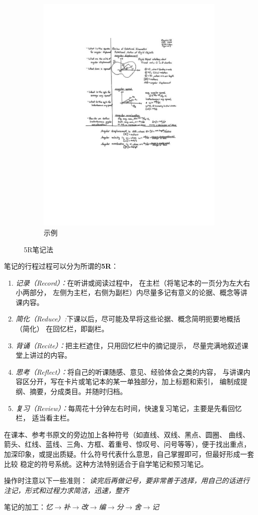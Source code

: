\begin{figure}[h]
\begin{subfigure}[t]{0.45\textwidth}
		\includegraphics[width=\textwidth]{./images/Ch00/Cornell-NTS/exCNTS.pdf}
		\caption{示例}\label{fig:5R-2}
	\end{subfigure}
	\caption{5R笔记法}\label{fig:5R}
\end{figure}
	
笔记的行程过程可以分为所谓的{\bf 5R}：

\begin{enumerate}[Step1]
  \setlength{\itemindent}{1cm}
  \setlength{\topsep}{0pt}
  \item {\it 记录（Record）：}在听讲或阅读过程中，
  在主栏（将笔记本的一页分为左大右小两部分，
  左侧为主栏，右侧为副栏）内尽量多记有意义的论据、概念等讲课内容。
  \item {\it 简化（Reduce）:}下课以后，尽可能及早将这些论据、概念简明扼要地概括（简化）
  在回忆栏，即副栏。
  \item {\it 背诵（Recite）：}把主栏遮住，只用回忆栏中的摘记提示，
  尽量完满地叙述课堂上讲过的内容。
  \item {\it 思考（Reflect）：}将自己的听课随感、意见、经验体会之类的内容，
  与讲课内容区分开，写在卡片或笔记本的某一单独部分，加上标题和索引，
  编制成提纲、摘要，分成类目。并随时归档。
  \item {\it 复习（Review）：}每周花十分钟左右时间，快速复习笔记，主要是先看回忆栏，
  适当看主栏。
\end{enumerate}

在课本、参考书原文的旁边加上各种符号（如直线、双线、黑点、圆圈、
曲线、箭头、红线、蓝线、三角、方框、着重号、惊叹号、问号等等），便于找出重点，
加深印象，或提出质疑。什么符号代表什么意思，自己掌握即可，但最好形成一套比较
稳定的符号系统。这种方法特别适合于自学笔记和预习笔记。

操作时注意以下一些准则：
{\it 读完后再做记号，要非常善于选择，用自己的话进行注记，形式和过程力求简洁，迅速，整齐}

笔记的加工：{\it 忆$\to$补$\to$改$\to$编$\to$分$\to$舍$\to$记}	
